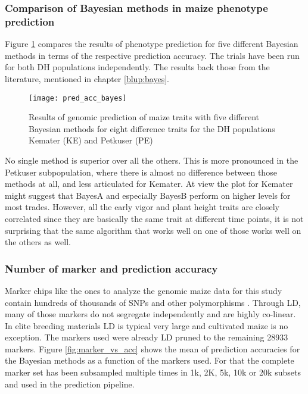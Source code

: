 \subsubsection{Comparison of Bayesian methods in maize phenotype prediction}

Figure \ref{fig:bayes_vs_acc} compares the results of phenotype prediction for five
different Bayesian methods in terms of the respective prediction accuracy. The trials have
been run for both DH populations independently. The results back those from the
literature, mentioned in chapter \ref{blup:bayes}.

\begin{figure}[H]
 \centering \texttt{[image: pred\_acc\_bayes]}
 \decoRule
 \caption[Results of genomic prediction of maize traits with five different Bayesian methods]{Results of genomic prediction of maize traits with five different Bayesian methods for eight difference traits for the DH populations Kemater (KE) and Petkuser (PE)}
\label{fig:bayes_vs_acc}
\end{figure}

No single method is superior over all the others. This is more pronounced in the Petkuser
subpopulation, where there is almost no difference between those methods at all, and less
articulated for Kemater. At view the plot for Kemater might suggest that BayesA and
especially BayesB perform on higher levels for most trades. However, all the early vigor
and plant height traits are closely correlated since they are basically the same trait at
different time points, it is not surprising that the same algorithm that works well on one
of those works well on the others as well.

\subsubsection{Number of marker and prediction accuracy}

Marker chips like the ones to analyze the genomic maize data for this study contain hundreds of
thousands of SNPs and other polymorphisms \cite{unterseer2014powerful}. Through LD, many
of those markers do not segregate independently and are highly co-linear. In elite
breeding materials LD is typical very large and cultivated maize is no exception. The
markers used were already LD pruned to the remaining 28933 markers.  Figure
\ref{fig:marker_vs_acc} shows the mean of prediction accuracies for the Bayesian methods
as a function of the markers used. For that the complete marker set has been subsampled
multiple times in 1k, 2K, 5k, 10k or 20k subsets and used in the prediction pipeline.

